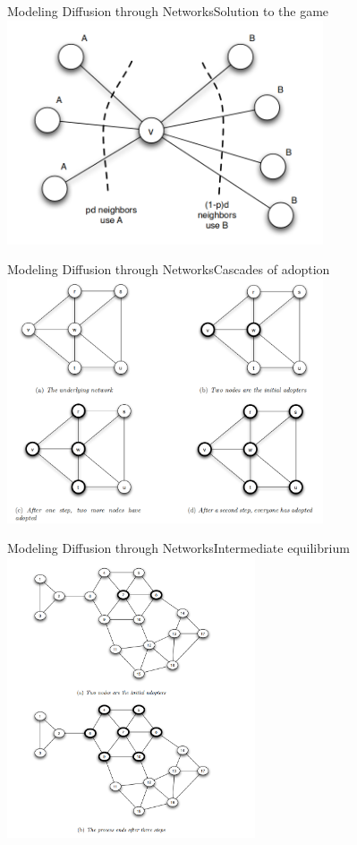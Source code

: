 \documentclass[notes, aspectratio=1610]{beamer}
\begin{document}
\begin{frame}{Modeling Diffusion through Networks}{Solution to the game}
	\centering
	\includegraphics[width=0.7\textwidth]{images/solution}
\end{frame}

\begin{frame}{Modeling Diffusion through Networks}{Cascades of adoption}
	\centering
	\includegraphics[width=0.7\textwidth]{images/underlying_net.png}
\end{frame}

\begin{frame}{Modeling Diffusion through Networks}{Intermediate equilibrium}
	\centering
	\includegraphics[width=0.55\textwidth]{images/intermediate_equilibrium.png}
\end{frame}
\end{document}

